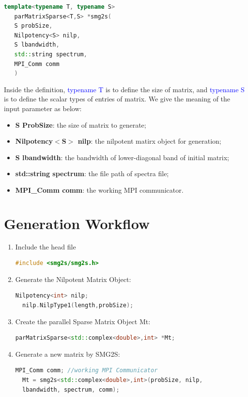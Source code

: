 \documentclass[a4paper, 10 pt]{report}
\begin{document}
	\begin{lstlisting}[language=C++,frame=single]
   template<typename T, typename S>
   parMatrixSparse<T,S> *smg2s(
   S probSize,
   Nilpotency<S> nilp,
   S lbandwidth,
   std::string spectrum,
   MPI_Comm comm
   )
	\end{lstlisting}
	
	Inside the definition, \textcolor{blue}{typename T} is to define the size of matrix, and  \textcolor{blue}{typename S} is to define the scalar types of entries of matrix. We give the meaning of the input parameter as below:
	
	\begin{itemize}
		\item \textbf{S ProbSize}: the size of matrix to generate;
		\item \textbf{Nilpotency$<$S$>$ nilp}: the nilpotent matirx object for generation;
		\item \textbf{S lbandwidth}: the bandwidth of lower-diagonal band of initial matrix;
		\item \textbf{std::string spectrum}: the file path of spectra file;
		\item \textbf{MPI\_Comm comm}: the working MPI communicator.
	\end{itemize}
	
	
	\section{Generation Workflow}
	\begin{enumerate}
		\item  Include the head file
		
		\begin{lstlisting}[language=C++,frame=single]
  #include <smg2s/smg2s.h>
		\end{lstlisting}
		
		\item Generate the Nilpotent Matrix Object:
		
		\begin{lstlisting}[language=C++,frame=single]
  Nilpotency<int> nilp;
  nilp.NilpType1(length,probSize);
		\end{lstlisting}
		
		\item Create the parallel Sparse Matrix Object Mt:
		
		\begin{lstlisting}[language=C++,frame=single]
  parMatrixSparse<std::complex<double>,int> *Mt;
		\end{lstlisting}
		
		\item Generate a new matrix by SMG2S:
		
		\begin{lstlisting}[language=C++,frame=single]
  MPI_Comm comm; //working MPI Communicator
  Mt = smg2s<std::complex<double>,int>(probSize, nilp, 
  lbandwidth, spectrum, comm);
		\end{lstlisting}
		
	\end{enumerate}
	
\end{document}
